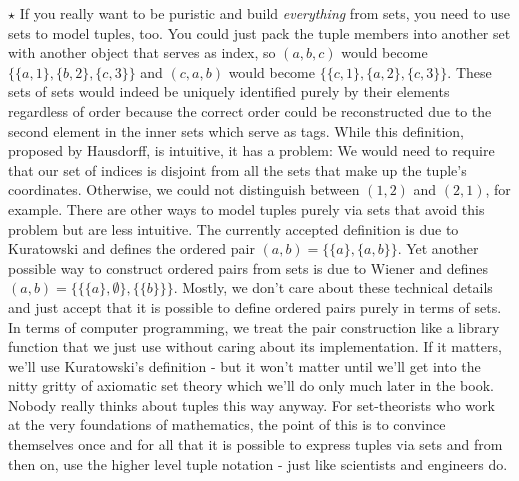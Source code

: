 \medskip
$\star$ If you really want to be puristic and build \emph{everything} from sets, you need to use sets to model tuples, too. You could just pack the tuple members into another set with another object that serves as index, so $(a,b,c)$ would become $\{\{a,1\},\{b,2\},\{c,3\}\}$ and $(c,a,b)$ would become $\{\{c,1\},\{a,2\},\{c,3\}\}$. These sets of sets would indeed be uniquely identified purely by their elements regardless of order because the correct order could be reconstructed due to the second element in the inner sets which serve as tags. While this definition, proposed by Hausdorff, is intuitive, it has a problem: We would need to require that our set of indices is disjoint from all the sets that make up the tuple's coordinates. Otherwise, we could not distinguish between $(1,2)$ and $(2,1)$, for example. There are other ways to model tuples purely via sets that avoid this problem but are less intuitive. The currently accepted definition is due to Kuratowski and defines the ordered pair $(a,b) = \{ \{a\}, \{a,b\} \}$. Yet another possible way to construct ordered pairs from sets is due to Wiener and defines $(a,b) = \{ \{\{a\},\emptyset\}, \{\{b\}\} \}$. Mostly, we don't care about these technical details and just accept that it is possible to define ordered pairs purely in terms of sets. In terms of computer programming, we treat the pair construction like a library function that we just use without caring about its implementation. If it matters, we'll use Kuratowski's definition - but it won't matter until we'll get into the nitty gritty of axiomatic set theory which we'll do only much later in the book. Nobody really thinks about tuples this way anyway. For set-theorists who work at the very foundations of mathematics, the point of this is to convince themselves once and for all that it is possible to express tuples via sets and from then on, use the higher level tuple notation - just like scientists and engineers do. 









